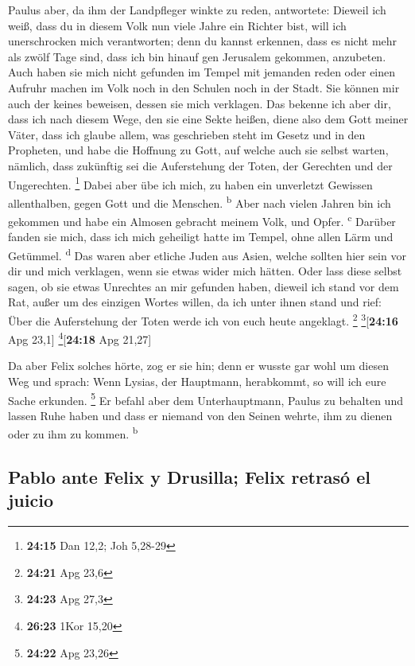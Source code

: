  Paulus aber, da ihm der Landpfleger winkte zu reden,
antwortete: Dieweil ich weiß, dass du in diesem Volk nun viele Jahre ein
Richter bist, will ich unerschrocken mich verantworten; 
denn du kannst erkennen, dass es nicht mehr als zwölf Tage sind, dass
ich bin hinauf gen Jerusalem gekommen, anzubeten.  Auch
haben sie mich nicht gefunden im Tempel mit jemanden reden oder einen
Aufruhr machen im Volk noch in den Schulen noch in der Stadt.
 Sie können mir auch der keines beweisen, dessen sie mich
verklagen.  Das bekenne ich aber dir, dass ich nach
diesem Wege, den sie eine Sekte heißen, diene also dem Gott meiner
Väter, dass ich glaube allem, was geschrieben steht im Gesetz und in den
Propheten,  und habe die Hoffnung zu Gott, auf welche
auch sie selbst warten, nämlich, dass zukünftig sei die Auferstehung der
Toten, der Gerechten und der Ungerechten. \footnote{\textbf{24:15} Dan
  12,2; Joh 5,28-29}  Dabei aber übe ich mich, zu haben
ein unverletzt Gewissen allenthalben, gegen Gott und die Menschen.
\textsuperscript{b}  Aber nach vielen Jahren bin ich
gekommen und habe ein Almosen gebracht meinem Volk, und Opfer.
\textsuperscript{c}  Darüber fanden sie mich, dass ich
mich geheiligt hatte im Tempel, ohne allen Lärm und Getümmel.
\textsuperscript{d}  Das waren aber etliche Juden aus
Asien, welche sollten hier sein vor dir und mich verklagen, wenn sie
etwas wider mich hätten.  Oder lass diese selbst sagen,
ob sie etwas Unrechtes an mir gefunden haben, dieweil ich stand vor dem
Rat,  außer um des einzigen Wortes willen, da ich unter
ihnen stand und rief: Über die Auferstehung der Toten werde ich von euch
heute angeklagt. \footnote{\textbf{24:21} Apg 23,6}
\footnote{\textbf{24:23} Apg 27,3}{[}\textbf{24:16} Apg 23,1{]}
\footnote{\textbf{26:23} 1Kor 15,20}{[}\textbf{24:18} Apg 21,27{]}

 Da aber Felix solches hörte, zog er sie hin; denn er
wusste gar wohl um diesen Weg und sprach: Wenn Lysias, der Hauptmann,
herabkommt, so will ich eure Sache erkunden. \footnote{\textbf{24:22}
  Apg 23,26}  Er befahl aber dem Unterhauptmann, Paulus
zu behalten und lassen Ruhe haben und dass er niemand von den Seinen
wehrte, ihm zu dienen oder zu ihm zu kommen. \textsuperscript{b}

\hypertarget{pablo-ante-felix-y-drusilla-felix-retrasuxf3-el-juicio}{%
\subsection{Pablo ante Felix y Drusilla; Felix retrasó el
juicio}\label{pablo-ante-felix-y-drusilla-felix-retrasuxf3-el-juicio}}

